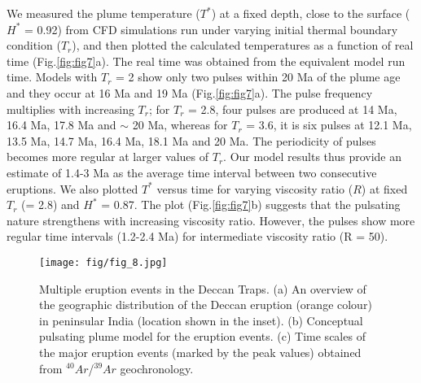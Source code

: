 \documentclass[12pt]{article}
\begin{document}
{We measured the plume temperature ($T^*$) at a fixed depth, close to the surface ($H^*$ = 0.92) from CFD simulations run under varying initial thermal boundary condition ($T_r$), and then plotted the calculated temperatures as a function of real time (Fig.\ref{fig:fig7}a). The real time was obtained from the equivalent model run time. Models with $T_r$ = 2 show only two pulses within 20 Ma of the plume age and they occur at 16 Ma and 19 Ma (Fig.\ref{fig:fig7}a). The pulse frequency multiplies with increasing $T_r$; for $T_r$ = 2.8, four pulses are produced at 14 Ma, 16.4 Ma, 17.8 Ma and $\sim$ 20 Ma, whereas for $T_r$ = 3.6, it is six pulses at 12.1 Ma, 13.5 Ma, 14.7 Ma, 16.4 Ma, 18.1 Ma and 20 Ma. The periodicity of pulses becomes more regular at larger values of $T_r$. Our model results thus provide an estimate of 1.4-3 Ma as the average time interval between two consecutive eruptions. We also plotted $T^*$ versus time for varying viscosity ratio ($R$) at fixed $T_r$ (= 2.8) and $H^*$ = 0.87. The plot (Fig.\ref{fig:fig7}b) suggests that the pulsating nature strengthens with increasing viscosity ratio. However, the pulses show more regular time intervals (1.2-2.4 Ma) for intermediate viscosity ratio (R = 50).

\begin{figure}[!htb]
 \begin{center}
{\texttt{[image: fig/fig\_8.jpg]} }
\caption{\small {Multiple eruption events in the Deccan Traps. (a) An overview of the geographic distribution of the Deccan eruption (orange colour) in peninsular India (location shown in the inset). (b) Conceptual pulsating plume model for the eruption events. (c) Time scales of the major eruption events (marked by  the peak values) obtained from $^{40}Ar$/$^{39}Ar$ geochronology.    }}
\label{fig:fig8}
 \end{center}
\end{figure}

}
\end{document}
